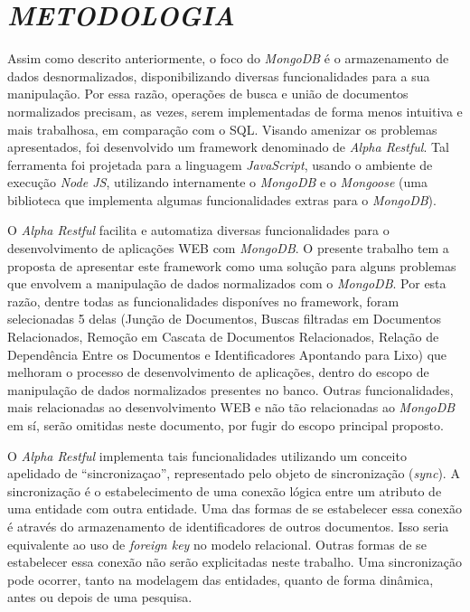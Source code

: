 \chapter{\textit{METODOLOGIA}}
\label{Metodologia}

Assim como descrito anteriormente, o foco do \textit{MongoDB} é o armazenamento de dados desnormalizados, disponibilizando diversas funcionalidades para a sua manipulação. Por essa razão, operações de busca e união de documentos normalizados precisam, as vezes, serem implementadas de forma menos intuitiva e mais trabalhosa, em comparação com o SQL. Visando amenizar os problemas apresentados, foi desenvolvido um framework denominado de \textit{Alpha Restful}. Tal ferramenta foi projetada para a linguagem \textit{JavaScript}, usando o ambiente de execução \textit{Node JS}, utilizando internamente o \textit{MongoDB} e o \textit{Mongoose} (uma biblioteca que implementa algumas funcionalidades extras para o \textit{MongoDB}).

O \textit{Alpha Restful} facilita e automatiza diversas funcionalidades para o desenvolvimento de aplicações WEB com \textit{MongoDB}. O presente trabalho tem a proposta de apresentar este framework como uma solução para alguns problemas que envolvem a manipulação de dados normalizados com o \textit{MongoDB}. Por esta razão, dentre todas as funcionalidades disponíves no framework, foram selecionadas 5 delas (Junção de Documentos, Buscas filtradas em Documentos Relacionados, Remoção em Cascata de Documentos Relacionados, Relação de Dependência Entre os Documentos e Identificadores Apontando para Lixo) que melhoram o processo de desenvolvimento de aplicações, dentro do escopo de manipulação de dados normalizados presentes no banco. Outras funcionalidades, mais relacionadas ao desenvolvimento WEB e não tão relacionadas ao \textit{MongoDB} em sí, serão omitidas neste documento, por fugir do escopo principal proposto.

O \textit{Alpha Restful} implementa tais funcionalidades utilizando um conceito apelidado de ``sincronizaçao'', representado pelo objeto de sincronização (\textit{sync}). A sincronização é o estabelecimento de uma conexão lógica entre um atributo de uma entidade com outra entidade. Uma das formas de se estabelecer essa conexão é através do armazenamento de identificadores de outros documentos. Isso seria equivalente ao uso de \textit{foreign key} no modelo relacional. Outras formas de se estabelecer essa conexão não serão explicitadas neste trabalho. Uma sincronização pode ocorrer, tanto na modelagem das entidades, quanto de forma dinâmica, antes ou depois de uma pesquisa.

